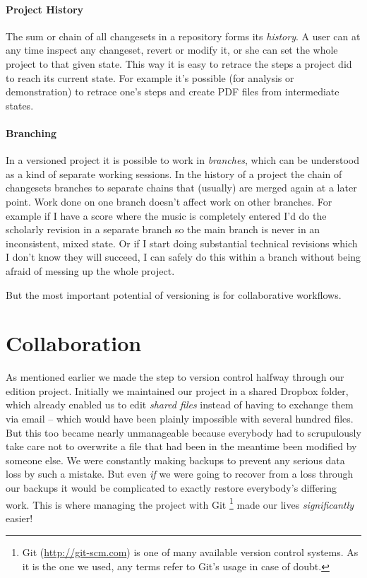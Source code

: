 \documentclass[11pt,a4paper]{article}
\begin{document}
\paragraph{Project History}
The sum or chain of all changesets in a repository forms its \emph{history}. A user can 
at any time inspect any changeset, revert or modify it, or she can set the whole project
to that given state. This way it is easy to retrace the steps a project did to reach
its current state. For example it's possible (for analysis or demonstration) to retrace
one's steps and create PDF files from intermediate states.

\paragraph{Branching}
In a versioned project it is possible to work in \emph{branches}, which can be
understood as a kind of separate working sessions. In the history of a project the chain
of changesets branches to separate chains that (usually) are merged again at a later point.
Work done on one branch doesn't affect work on other branches. For example if I have a
score where the music is completely entered I'd do the scholarly revision in a separate
branch so the main branch is never in an inconsistent, mixed state. Or if I start doing
substantial technical revisions which I don't know they will succeed, I can safely do
this within a branch without being afraid of messing up the whole project.

\medskip
But the most important potential of versioning is for collaborative workflows.

\section{Collaboration}
As mentioned earlier we made the step to version control halfway through our edition
project. Initially we maintained our project in a shared Dropbox folder, which already
enabled us to edit \emph{shared files} instead of having to exchange them via email --
which would have been plainly impossible with several hundred files. But this too
became nearly unmanageable because everybody had to scrupulously take care not to
overwrite a file that had been in the meantime been modified by someone else. We were
constantly making backups to prevent any serious data loss by such a mistake. But even
\emph{if} we were going to recover from a loss through our backups it would be complicated
to exactly restore everybody's differing work. This is where managing the project with Git%
\footnote{Git (\url{http://git-scm.com}) is one of many available version control systems.
As it is the one we used, any terms refer to Git's usage in case of doubt.}
made our lives \emph{significantly} easier!
\end{document}
